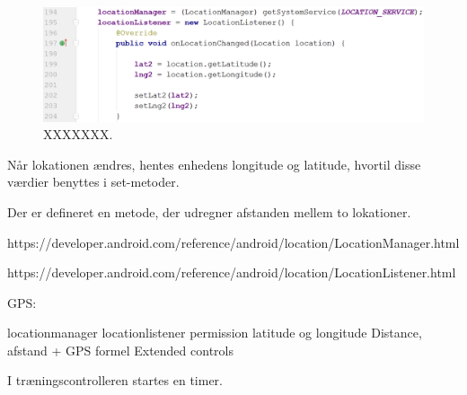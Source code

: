 \begin{figure} [H]
\centering
\includegraphics[width=1\textwidth]{figures/imple/gpsKode}
\caption{XXXXXXX.}
\label{fig:gpsKode}
\end{figure} 

Når lokationen ændres, hentes enhedens longitude og latitude, hvortil disse værdier benyttes i set-metoder. 

Der er defineret en metode, der udregner afstanden mellem to lokationer.



https://developer.android.com/reference/android/location/LocationManager.html 

https://developer.android.com/reference/android/location/LocationListener.html

 


GPS:

locationmanager
locationlistener
permission
latitude og longitude
Distance, afstand  + GPS formel
Extended controls


I træningscontrolleren startes en timer. 






